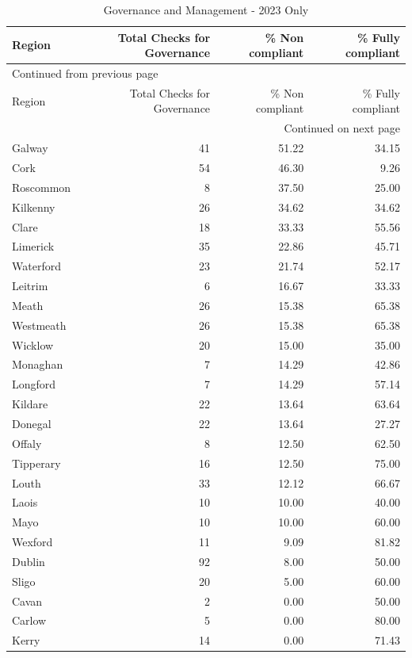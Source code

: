 \documentclass[a4paper,11pt,twoside]{article}
\begin{document}
\begin{longtable}{lrrr}
\caption{Governance and Management - 2023 Only}
\\[0pt]
Region & Total Checks for Governance & \% Non compliant & \% Fully compliant\\[0pt]
\hline
\endfirsthead
\multicolumn{4}{l}{Continued from previous page} \\[0pt]
\hline

Region & Total Checks for Governance & \% Non compliant & \% Fully compliant \\[0pt]

\hline
\endhead
\hline\multicolumn{4}{r}{Continued on next page} \\
\endfoot
\endlastfoot
\hline
Galway & 41 & 51.22 & 34.15\\[0pt]
Cork & 54 & 46.30 & 9.26\\[0pt]
Roscommon & 8 & 37.50 & 25.00\\[0pt]
Kilkenny & 26 & 34.62 & 34.62\\[0pt]
Clare & 18 & 33.33 & 55.56\\[0pt]
Limerick & 35 & 22.86 & 45.71\\[0pt]
Waterford & 23 & 21.74 & 52.17\\[0pt]
Leitrim & 6 & 16.67 & 33.33\\[0pt]
Meath & 26 & 15.38 & 65.38\\[0pt]
Westmeath & 26 & 15.38 & 65.38\\[0pt]
Wicklow & 20 & 15.00 & 35.00\\[0pt]
Monaghan & 7 & 14.29 & 42.86\\[0pt]
Longford & 7 & 14.29 & 57.14\\[0pt]
Kildare & 22 & 13.64 & 63.64\\[0pt]
Donegal & 22 & 13.64 & 27.27\\[0pt]
Offaly & 8 & 12.50 & 62.50\\[0pt]
Tipperary & 16 & 12.50 & 75.00\\[0pt]
Louth & 33 & 12.12 & 66.67\\[0pt]
Laois & 10 & 10.00 & 40.00\\[0pt]
Mayo & 10 & 10.00 & 60.00\\[0pt]
Wexford & 11 & 9.09 & 81.82\\[0pt]
Dublin & 92 & 8.00 & 50.00\\[0pt]
Sligo & 20 & 5.00 & 60.00\\[0pt]
Cavan & 2 & 0.00 & 50.00\\[0pt]
Carlow & 5 & 0.00 & 80.00\\[0pt]
Kerry & 14 & 0.00 & 71.43\\[0pt]
\end{longtable}
\end{document}
